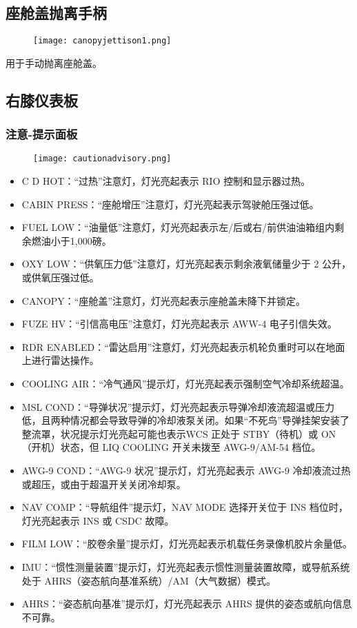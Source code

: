 \subsection{座舱盖抛离手柄}
\begin{figure}[htb]
	\centering
	\texttt{[image: canopyjettison1.png]}
\end{figure}
用于手动抛离座舱盖。

\subsection{右膝仪表板}

\subsubsection{注意-提示面板}
\begin{figure}[htb]
	\centering
	\texttt{[image: cautionadvisory.png]}
\end{figure}
\begin{itemize}
	\item C D HOT：“过热”注意灯，灯光亮起表示 RIO 控制和显示器过热。
	\item CABIN PRESS：“座舱增压”注意灯，灯光亮起表示驾驶舱压强过低。
	\item FUEL LOW：“油量低”注意灯，灯光亮起表示左/后或右/前供油油箱组内剩余燃油小于1,000磅。
	\item OXY LOW：“供氧压力低”注意灯，灯光亮起表示剩余液氧储量少于 2 公升，或供氧压强过低。
	\item CANOPY：“座舱盖”注意灯，灯光亮起表示座舱盖未降下并锁定。
	\item FUZE HV：“引信高电压”注意灯，灯光亮起表示 AWW-4 电子引信失效。
	\item RDR ENABLED：“雷达启用”注意灯，灯光亮起表示机轮负重时可以在地面上进行雷达操作。
	\item COOLING AIR：“冷气通风”提示灯，灯光亮起表示强制空气冷却系统超温。
	\item MSL COND：“导弹状况”提示灯，灯光亮起表示导弹冷却液流超温或压力低，且两种情况都会导致导弹的冷却液泵关闭。如果“不死鸟”导弹挂架安装了整流罩，状况提示灯光亮起可能也表示WCS 正处于 STBY（待机）或 ON（开机）状态，但 LIQ COOLING 开关未拨至 AWG-9/AM-54 档位。
	\item AWG-9 COND：“AWG-9 状况”提示灯，灯光亮起表示 AWG-9 冷却液流过热或超压，或由于超温开关关闭冷却泵。
	\item NAV COMP：“导航组件”提示灯，NAV MODE 选择开关位于 INS 档位时，灯光亮起表示 INS 或 CSDC 故障。
	\item FILM LOW：“胶卷余量”提示灯，灯光亮起表示机载任务录像机胶片余量低。
	\item IMU：“惯性测量装置”提示灯，灯光亮起表示惯性测量装置故障，或导航系统处于 AHRS（姿态航向基准系统）/AM（大气数据）模式。
	\item AHRS：“姿态航向基准”提示灯，灯光亮起表示 AHRS 提供的姿态或航向信息不可靠。
\end{itemize}

